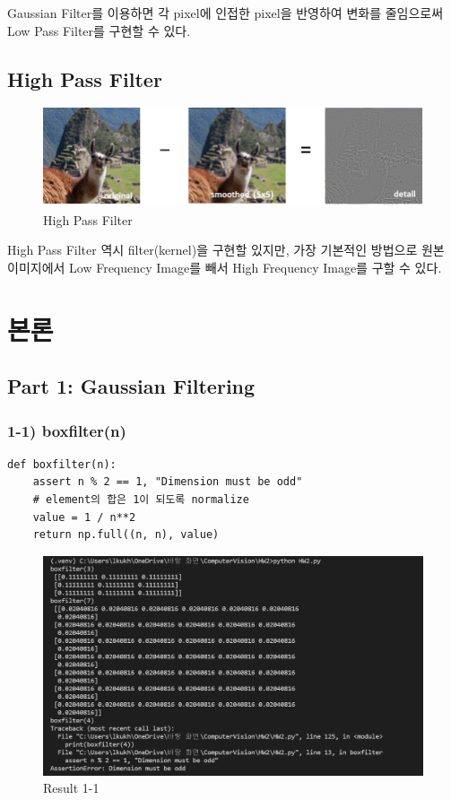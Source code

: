 \documentclass[]{report}
\begin{document}
Gaussian Filter를 이용하면 각 pixel에 인접한 pixel을 반영하여 변화를 줄임으로써 Low Pass Filter를 구현할 수 있다. \\

\section{High Pass Filter}
\begin{figure}[ht!]
	\centering
	\includegraphics[width=1\textwidth]{image/highPassFilter.png}
	\caption{High Pass Filter}
	\label{highPassFilter}
\end{figure} 

High Pass Filter 역시 filter(kernel)을 구현할 있지만, 가장 기본적인 방법으로 원본 이미지에서 Low Frequency Image를 빼서 High Frequency Image를 구할 수 있다. \\


\chapter{본론}
\section{Part 1: Gaussian Filtering}
\subsection*{1-1) boxfilter(n)}
\begin{lstlisting}
def boxfilter(n):
	assert n % 2 == 1, "Dimension must be odd"
	# element의 합은 1이 되도록 normalize
	value = 1 / n**2
	return np.full((n, n), value)
\end{lstlisting}

\begin{figure}[ht!]
	\centering
	\includegraphics[width=1\textwidth]{image/result_1-1.png}
	\caption{Result 1-1}
	\label{result1_1}
\end{figure}
\end{document}
